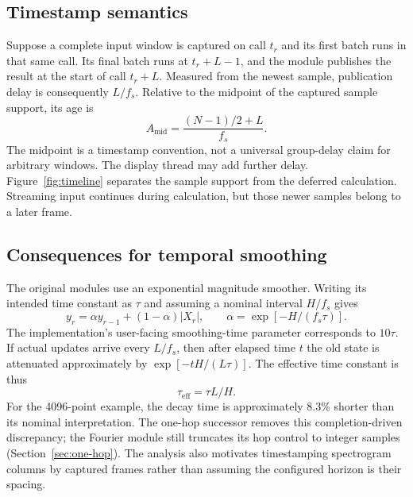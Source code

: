\subsection{Timestamp semantics}
Suppose a complete input window is captured on call $t_r$ and its first batch
runs in that same call. Its final batch runs at $t_r+L-1$, and the module
publishes the result at the start of call $t_r+L$. Measured from the newest
sample, publication delay is consequently $L/f_s$. Relative to the midpoint
of the captured sample support, its age is
\begin{equation}
 A_{\mathrm{mid}}=\frac{(N-1)/2+L}{f_s}.
 \label{eq:age}
\end{equation}
The midpoint is a timestamp convention, not a universal group-delay claim for
arbitrary windows. The display thread may add further delay. Figure~\ref{fig:timeline}
separates the sample support from the deferred calculation. Streaming input
continues during calculation, but those newer samples belong to a later frame.



\subsection{Consequences for temporal smoothing}
The original modules use an exponential magnitude smoother. Writing its intended time
constant as $\tau$ and assuming a nominal interval $H/f_s$ gives
\begin{equation}
 y_r=\alpha y_{r-1}+(1-\alpha)|X_r|,\qquad
 \alpha=\exp[-H/(f_s\tau)].
\end{equation}
The implementation's user-facing smoothing-time parameter corresponds to
$10\tau$. If actual updates arrive every $L/f_s$, then after elapsed time $t$
the old state is attenuated approximately by
$\exp[-tH/(L\tau)]$. The effective time constant is thus
\begin{equation}
 \tau_{\mathrm{eff}}=\tau L/H.
\end{equation}
For the 4096-point example, the decay time is approximately 8.3\% shorter than
its nominal interpretation. The one-hop successor removes this completion-driven discrepancy; the Fourier module
still truncates its hop control to integer samples (Section~\ref{sec:one-hop}). The analysis also motivates timestamping
spectrogram columns by captured frames rather than assuming the configured
horizon is their spacing.

